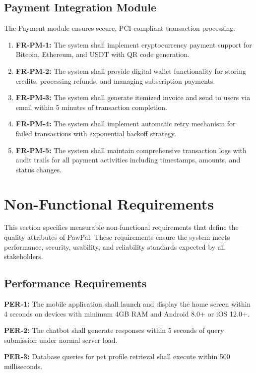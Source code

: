 \subsection{Payment Integration Module}
The Payment module ensures secure, PCI-compliant transaction processing.

\begin{enumerate}

    \item \textbf{FR-PM-1:} The system shall implement cryptocurrency payment support for Bitcoin, Ethereum, and USDT with QR code generation.
    \item \textbf{FR-PM-2:} The system shall provide digital wallet functionality for storing credits, processing refunds, and managing subscription payments.
    \item \textbf{FR-PM-3:} The system shall generate itemized invoice and send to users via email within 5 minutes of transaction completion.
    \item \textbf{FR-PM-4:} The system shall implement automatic retry mechanism for failed transactions with exponential backoff strategy.
    \item \textbf{FR-PM-5:} The system shall maintain comprehensive transaction logs with audit trails for all payment activities including timestamps, amounts, and status changes.
\end{enumerate}

\section{Non-Functional Requirements}
This section specifies measurable non-functional requirements that define the quality attributes of PawPal. These requirements ensure the system meets performance, security, usability, and reliability standards expected by all stakeholders.

\subsection{Performance Requirements}

\textbf{PER-1:} The mobile application shall launch and display the home screen within 4 seconds on devices with minimum 4GB RAM and Android 8.0+ or iOS 12.0+.

\textbf{PER-2:} The chatbot shall generate responses within 5 seconds of query submission under normal server load.

\textbf{PER-3:} Database queries for pet profile retrieval shall execute within 500 milliseconds.

